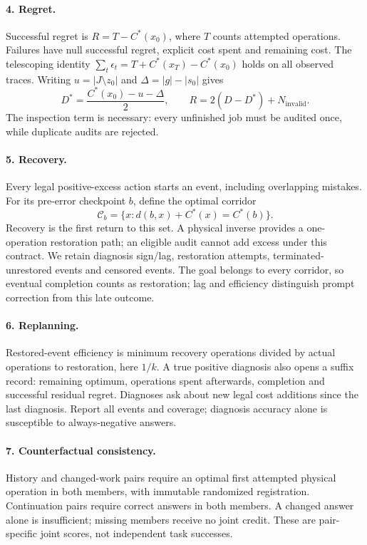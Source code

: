 \documentclass[10pt,twocolumn]{article}
\begin{document}
\paragraph{4. Regret.}
Successful regret is $R=T-C^*(x_0)$, where $T$ counts attempted operations.
Failures have null successful regret, explicit cost spent and remaining
cost. The telescoping identity
$\sum_t\epsilon_t=T+C^*(x_T)-C^*(x_0)$ holds on all observed traces.
Writing $u=|J\setminus z_0|$ and $\Delta=|g|-|s_0|$ gives
\[
D^*=\frac{C^*(x_0)-u-\Delta}{2},\qquad
R=2(D-D^*)+N_{\mathrm{invalid}}.
\]
The inspection term is necessary: every unfinished job must be audited
once, while duplicate audits are rejected.

\paragraph{5. Recovery.}
Every legal positive-excess action starts an event, including overlapping
mistakes. For its pre-error checkpoint $b$, define the optimal corridor
\[
\mathcal C_b=\{x:d(b,x)+C^*(x)=C^*(b)\}.
\]
Recovery is the first return to this set. A physical inverse provides
a one-operation restoration path; an eligible audit cannot add excess
under this contract. We retain diagnosis sign/lag, restoration attempts,
terminated-unrestored events and censored events.
The goal belongs to every corridor, so eventual completion counts as
restoration; lag and efficiency distinguish prompt correction from this
late outcome.

\paragraph{6. Replanning.}
Restored-event efficiency is minimum recovery operations divided by actual
operations to restoration, here $1/k$. A true positive diagnosis also
opens a suffix record: remaining optimum, operations spent afterwards,
completion and successful residual regret. Diagnoses ask about new legal
cost additions since the last diagnosis. Report all events and coverage;
diagnosis accuracy alone is susceptible to always-negative answers.

\paragraph{7. Counterfactual consistency.}
History and changed-work pairs require an optimal first attempted physical
operation in both members, with immutable randomized registration.
Continuation pairs require correct answers in both members. A changed
answer alone is insufficient; missing members receive no joint credit.
These are pair-specific joint scores, not independent task successes.
\end{document}
